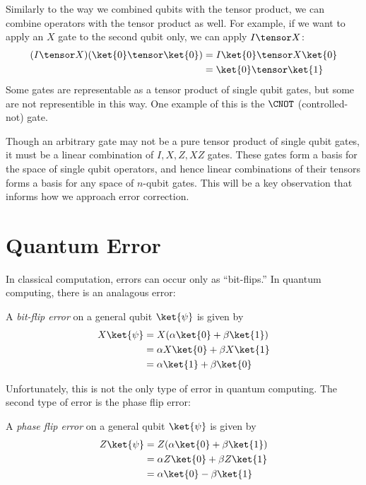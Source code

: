 \documentclass{article}
\begin{document}
        Similarly to the way we combined qubits with the tensor product, we can combine operators with the tensor product as well.
        For example, if we want to apply an $X$ gate to the second qubit only, we can apply $I \tensor X$:
        \begin{align*}
        (I \tensor X)(\ket{0} \tensor \ket{0}) &= I \ket{0} \tensor X \ket{0}\\
        &= \ket{0} \tensor \ket{1}
        \end{align*}
        Some gates are representable as a tensor product of single qubit gates, but some are not representible in this way.
        One example of this is the $\CNOT$ (controlled-not) gate.

        Though an arbitrary gate may not be a pure tensor product of single qubit gates, it must be a linear combination of $I, X, Z, XZ$ gates.
        These gates form a basis for the space of single qubit operators, and hence linear combinations of their tensors forms a basis for any space of $n$-qubit gates.
        This will be a key observation that informs how we approach error correction.

\section{Quantum Error}

        In classical computation, errors can occur only as ``bit-flips.''
        In quantum computing, there is an analagous error:
        \begin{definition}
                A \textit{bit-flip error} on a general qubit $\ket{\psi}$ is given by
                \begin{align*}
                X \ket{\psi} &= X(\alpha \ket{0} + \beta \ket{1})\\
                &= \alpha X \ket{0} + \beta X \ket{1}\\
                &= \alpha \ket{1} + \beta \ket{0}
                \end{align*}
        \end{definition}

        Unfortunately, this is not the only type of error in quantum computing.
        The second type of error is the phase flip error:
        \begin{definition}
                A \textit{phase flip error} on a general qubit $\ket{\psi}$ is given by
                \begin{align*}
                Z \ket{\psi} &= Z(\alpha \ket{0} + \beta \ket{1})\\
                &= \alpha Z \ket{0} + \beta Z \ket{1}\\
                &= \alpha \ket{0} - \beta \ket{1}
                \end{align*}
        \end{definition}
\end{document}
